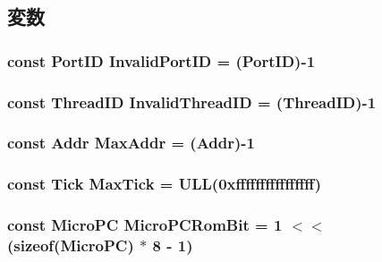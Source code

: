 \subsection{変数}
\hypertarget{base_2types_8hh_a65bf40f138cf863f0c5e2d8ca1144126}{
\subsubsection[{InvalidPortID}]{\setlength{\rightskip}{0pt plus 5cm}const {\bf PortID} {\bf InvalidPortID} = ({\bf PortID})-\/1}}
\label{base_2types_8hh_a65bf40f138cf863f0c5e2d8ca1144126}
\hypertarget{base_2types_8hh_a192b210a26f038691d0f095d85dc0953}{
\subsubsection[{InvalidThreadID}]{\setlength{\rightskip}{0pt plus 5cm}const {\bf ThreadID} {\bf InvalidThreadID} = ({\bf ThreadID})-\/1}}
\label{base_2types_8hh_a192b210a26f038691d0f095d85dc0953}
\hypertarget{base_2types_8hh_a65da65e69ea5fb1119733a22d695b6f9}{
\subsubsection[{MaxAddr}]{\setlength{\rightskip}{0pt plus 5cm}const {\bf Addr} {\bf MaxAddr} = ({\bf Addr})-\/1}}
\label{base_2types_8hh_a65da65e69ea5fb1119733a22d695b6f9}
\hypertarget{base_2types_8hh_abe940b1b328825e234da719447e15ca5}{
\subsubsection[{MaxTick}]{\setlength{\rightskip}{0pt plus 5cm}const {\bf Tick} {\bf MaxTick} = ULL(0xffffffffffffffff)}}
\label{base_2types_8hh_abe940b1b328825e234da719447e15ca5}
\hypertarget{base_2types_8hh_a1d50f14bd4d49816054d6a32c71e1ca3}{
\subsubsection[{MicroPCRomBit}]{\setlength{\rightskip}{0pt plus 5cm}const {\bf MicroPC} {\bf MicroPCRomBit} = 1 $<$$<$ (sizeof({\bf MicroPC}) $\ast$ 8 -\/ 1)}}
\label{base_2types_8hh_a1d50f14bd4d49816054d6a32c71e1ca3}
